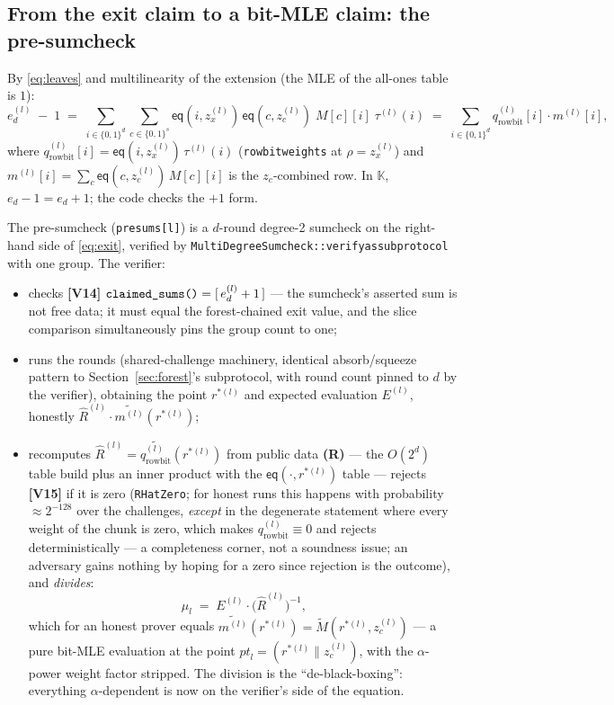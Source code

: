 \documentclass[11pt]{article}
\newcommand{\K}{\mathbb{K}}            %
\newcommand{\bits}{\{0,1\}}
\newcommand{\mle}[1]{\widetilde{#1}}
\newcommand{\eq}{\mathsf{eq}}
\newcommand{\code}[1]{{\def\_{\textunderscore\allowbreak}\texttt{#1}}}
\newcommand{\Vc}[1]{\textbf{[V#1]}}    %
\begin{document}
\subsection{From the exit claim to a bit-MLE claim: the pre-sumcheck}

By \eqref{eq:leaves} and multilinearity of the extension (the MLE of the
all-ones table is $1$):
\begin{equation}\label{eq:exit}
  e_d^{(l)} \;-\; 1
  \;=\; \sum_{i \in \bits^{d}} \sum_{c \in \bits^s}
        \eq(i, z_x^{(l)})\,\eq(c, z_c^{(l)})\; M[c][i]\;\tau^{(l)}(i)
  \;=\; \sum_{i \in \bits^{d}} q^{(l)}_{\mathrm{rowbit}}[i]\cdot m^{(l)}[i],
\end{equation}
where
$q^{(l)}_{\mathrm{rowbit}}[i] = \eq(i, z_x^{(l)})\,\tau^{(l)}(i)$
(\code{row\_bit\_weights} at $\rho = z_x^{(l)}$) and
$m^{(l)}[i] = \sum_c \eq(c, z_c^{(l)})\, M[c][i]$ is the
$z_c$-combined row.  In $\K$, $e_d - 1 = e_d + 1$; the code checks the
$+1$ form.

The pre-sumcheck (\code{presums[l]}) is a $d$-round degree-2 sumcheck on
the right-hand side of \eqref{eq:exit}, verified by
\code{MultiDegreeSumcheck::verify\_as\_subprotocol} with one group.  The
verifier:
\begin{itemize}[itemsep=1pt]
\item checks \Vc{14}
  $\code{claimed\_sums()} = [\,e_d^{(l)} + 1\,]$ — the sumcheck's asserted
  sum is not free data; it must equal the forest-chained exit value, and
  the slice comparison simultaneously pins the group count to one;
\item runs the rounds (shared-challenge machinery, identical
  absorb/squeeze pattern to Section~\ref{sec:forest}'s subprotocol, with
  round count pinned to $d$ by the verifier), obtaining the point
  $r^{*(l)}$ and expected evaluation $E^{(l)}$, honestly
  $\widehat{R}^{(l)} \cdot \mle{m^{(l)}}(r^{*(l)})$;
\item recomputes $\widehat{R}^{(l)} =
  \mle{q^{(l)}_{\mathrm{rowbit}}}(r^{*(l)})$ from public data
  \textbf{(R)} — the $O(2^{d})$ table build plus an inner product with
  the $\eq(\cdot, r^{*(l)})$ table — rejects \Vc{15} if it is zero
  (\code{RHatZero}; for honest runs this happens with probability
  $\approx 2^{-128}$ over the challenges, \emph{except} in the degenerate
  statement where every weight of the chunk is zero, which makes
  $q^{(l)}_{\mathrm{rowbit}} \equiv 0$ and rejects deterministically — a
  completeness corner, not a soundness issue; an adversary gains nothing
  by hoping for a zero since rejection is the outcome), and
  \emph{divides}:
  \[
    \mu_l \;=\; E^{(l)} \cdot \big(\widehat{R}^{(l)}\big)^{-1},
  \]
  which for an honest prover equals
  $\mle{m^{(l)}}(r^{*(l)}) = \mle{M}(r^{*(l)}, z_c^{(l)})$ — a pure
  bit-MLE evaluation at the point
  $\mathit{pt}_l = (r^{*(l)} \| z_c^{(l)})$, with the $\alpha$-power
  weight factor stripped.  The division is the ``de-black-boxing'':
  everything $\alpha$-dependent is now on the verifier's side of the
  equation.
\end{itemize}
\end{document}
